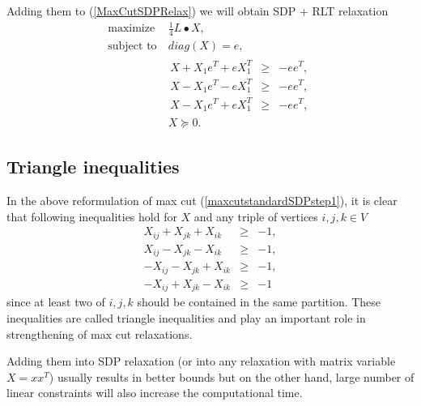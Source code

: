 \documentclass[12pt]{book}
\theoremstyle{definition}
\begin{document}
Adding them to (\ref{MaxCutSDPRelax}) we will obtain SDP + RLT relaxation 
\begin{equation}
\label{MaxCutSDP+RLTRelax}
\begin{array}{ll}
\mbox{maximize} & \ \frac{1}{4}L\bullet X, \\
\mbox{subject to} & \ diag(X) = e , \\
& \begin{array}{lcl}
		 X + X_1e^T + eX_1^T & \geq & -ee^T, \\
		 X - X_1e^T - eX_1^T & \geq & -ee^T, \\
		 X - X_1e^T + eX_1^T & \geq & -ee^T,
\end{array} \\
&\	X\succeq 0.
\end{array}
\end{equation} 


\subsection{Triangle inequalities}

In the above reformulation of max cut (\ref{maxcutstandardSDPstep1}),
it is clear that following inequalities hold for $X$ and any triple of vertices $i,j,k\in V$
\begin{equation}
\label{MaxCutTriangleInequalities}
\begin{array}{rcl}
X_{ij} + X_{jk} + X_{ik} &\geq & -1, \\
X_{ij} - X_{jk} - X_{ik} &\geq & -1, \\
- X_{ij} - X_{jk} + X_{ik} &\geq & -1, \\
- X_{ij} + X_{jk} - X_{ik} &\geq & -1
\end{array}
\end{equation}
since at least two of $i,j,k$ should be contained in the same partition.
These inequalities are called triangle inequalities and play an important role in strengthening of max cut relaxations. 

Adding them into SDP relaxation (or into any relaxation with matrix variable $X=xx^T$) usually results in better bounds but on the other hand, large number of linear constraints will also increase the computational time.	
\end{document}
